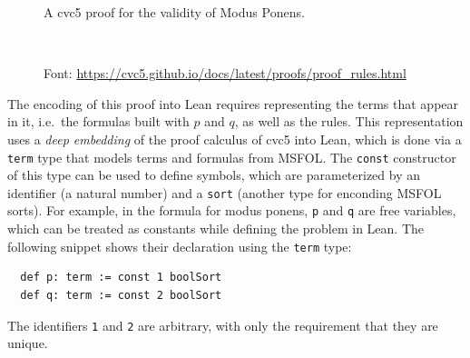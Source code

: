 \begin{figure}[t!]
  \centering
  \caption{A cvc5 proof for the validity of Modus Ponens.}~\label{fig:cvc5-proof}
  \caption*{Font: \url{https://cvc5.github.io/docs/latest/proofs/proof_rules.html}}
\end{figure}

The encoding of this proof into Lean requires representing the terms that appear
in it, i.e.\ the formulas built with $p$ and $q$, as well as the rules.
%
This representation uses a \emph{deep embedding} of the proof calculus of cvc5 into
Lean,
which is done via a \texttt{term} type that models terms and formulas from MSFOL.
The \texttt{const} constructor of this type can be used to define symbols,
which are parameterized by an identifier (a natural number) and a \texttt{sort}
(another type for enconding MSFOL sorts).
%
For example, in the formula for modus ponens, \texttt{p} and \texttt{q} are
free variables, which can be treated as constants while defining the problem in Lean.
The following snippet shows their declaration using the \texttt{term} type:

\begin{verbatim}
  def p: term := const 1 boolSort
  def q: term := const 2 boolSort
\end{verbatim}

The identifiers \texttt{1} and \texttt{2} are arbitrary, with only the
requirement that they are unique.


